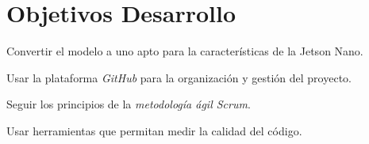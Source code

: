 \section{Objetivos Desarrollo}
\begin{list}{\textbullet}{ %
    \addtolength{\itemsep}{-2mm} %
    \setlength{\itemindent}{2mm}}

    \item Convertir el modelo a uno apto para la características de la Jetson Nano.
    \item Usar la plataforma \textit{GitHub} para la organización y gestión del proyecto.
    \item Seguir los principios de la \textit{metodología ágil Scrum}.
    \item Usar herramientas que permitan medir la calidad del código.
\end{list}

